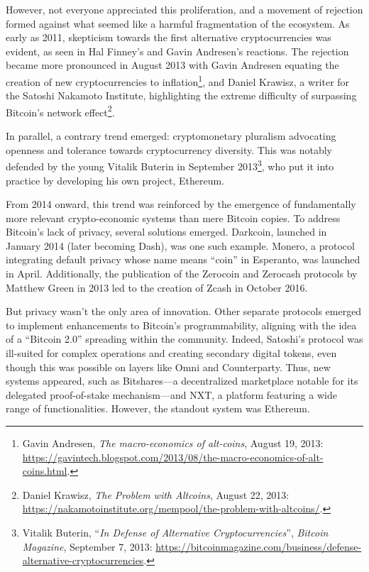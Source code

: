 \documentclass[
  a5paper,
  smalldemyvopaper,10pt,twoside,onecolumn,openright,extrafontsizes,hidelinks]{memoir}
\begin{document}
However, not everyone appreciated this proliferation, and a movement of
rejection formed against what seemed like a harmful fragmentation of the
ecosystem. As early as 2011, skepticism towards the first alternative
cryptocurrencies was evident, as seen in Hal Finney's and Gavin
Andresen's reactions. The rejection became more pronounced in August
2013 with Gavin Andresen equating the creation of new cryptocurrencies
to inflation\footnote{Gavin Andresen, \emph{The macro-economics of
  alt-coins}, August 19, 2013:
  \url{https://gavintech.blogspot.com/2013/08/the-macro-economics-of-alt-coins.html}.},
and Daniel Krawisz, a writer for the Satoshi Nakamoto Institute,
highlighting the extreme difficulty of surpassing Bitcoin's network
effect\footnote{Daniel Krawisz, \emph{The Problem with Altcoins}, August
  22, 2013:
  \url{https://nakamotoinstitute.org/mempool/the-problem-with-altcoins/}.}.

In parallel, a contrary trend emerged: cryptomonetary pluralism
advocating openness and tolerance towards cryptocurrency diversity. This
was notably defended by the young Vitalik Buterin in September
2013\footnote{Vitalik Buterin, ``\emph{In Defense of Alternative
  Cryptocurrencies}'', \emph{Bitcoin Magazine}, September 7, 2013:
  \url{https://bitcoinmagazine.com/business/defense-alternative-cryptocurrencies}.},
who put it into practice by developing his own project, Ethereum.

From 2014 onward, this trend was reinforced by the emergence of
fundamentally more relevant crypto-economic systems than mere Bitcoin
copies. To address Bitcoin's lack of privacy, several solutions emerged.
Darkcoin, launched in January 2014 (later becoming Dash), was one such
example. Monero, a protocol integrating default privacy whose name means
``coin'' in Esperanto, was launched in April. Additionally, the
publication of the Zerocoin and Zerocash protocols by Matthew Green in
2013 led to the creation of Zcash in October 2016.

But privacy wasn't the only area of innovation. Other separate protocols
emerged to implement enhancements to Bitcoin's programmability, aligning
with the idea of a ``Bitcoin 2.0'' spreading within the community.
Indeed, Satoshi's protocol was ill-suited for complex operations and
creating secondary digital tokens, even though this was possible on
layers like Omni and Counterparty. Thus, new systems appeared, such as
Bitshares---a decentralized marketplace notable for its delegated
proof-of-stake mechanism---and NXT, a platform featuring a wide range of
functionalities. However, the standout system was Ethereum.
\end{document}
